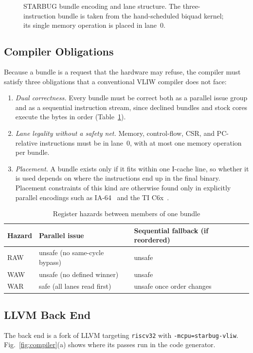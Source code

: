 \documentclass[conference]{IEEEtran}
\begin{document}
\begin{figure}[t]
\centering

\caption{STARBUG bundle encoding and lane structure. The three-instruction bundle is taken from the hand-scheduled biquad kernel; its single memory operation is placed in lane~0.}
\label{fig:arch}
\end{figure}

\subsection{Compiler Obligations}
Because a bundle is a request that the hardware may refuse, the compiler must satisfy three obligations that a conventional VLIW compiler does not face:
\begin{enumerate}
\item \emph{Dual correctness.} Every bundle must be correct both as a parallel issue group and as a sequential instruction stream, since declined bundles and stock cores execute the bytes in order (Table~\ref{tab:hazards}).
\item \emph{Lane legality without a safety net.} Memory, control-flow, CSR, and PC-relative instructions must be in lane~0, with at most one memory operation per bundle.
\item \emph{Placement.} A bundle exists only if it fits within one I-cache line, so whether it is used depends on where the instructions end up in the final binary. Placement constraints of this kind are otherwise found only in explicitly parallel encodings such as IA-64~\cite{schlansker-epic-2000} and the TI C6x~\cite{ti-c6000}.
\end{enumerate}

\begin{table}[t]
\centering
\caption{Register hazards between members of one bundle}
\label{tab:hazards}
\footnotesize\setlength{\tabcolsep}{4pt}
\begin{tabular}{@{}lll@{}}
\toprule
Hazard & Parallel issue & Sequential fallback (if reordered)\\
\midrule
RAW & unsafe (no same-cycle bypass) & unsafe\\
WAW & unsafe (no defined winner) & unsafe\\
WAR & safe (all lanes read first) & unsafe once order changes\\
\bottomrule
\end{tabular}
\end{table}

\subsection{LLVM Back End}
The back end is a fork of LLVM targeting \texttt{riscv32} with \texttt{-mcpu=starbug-vliw}. Fig.~\ref{fig:compiler}(a) shows where its passes run in the code generator.
\end{document}
